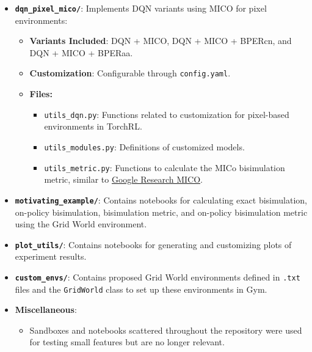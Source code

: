 \begin{itemize}
    \item \textbf{\texttt{dqn\_pixel\_mico/}}: Implements DQN variants using MICO for pixel environments:
    \begin{itemize}
        \item \textbf{Variants Included}: DQN + MICO, DQN + MICO + BPERcn, and DQN + MICO + BPERaa.
        \item \textbf{Customization}: Configurable through \texttt{config.yaml}.
        \item \textbf{Files:}
        \begin{itemize}
            \item \texttt{utils\_dqn.py}: Functions related to customization for pixel-based environments in TorchRL.
            \item \texttt{utils\_modules.py}: Definitions of customized models.
            \item \texttt{utils\_metric.py}: Functions to calculate the MICo bisimulation metric, similar to \href{https://github.com/google-research/google-research/blob/master/mico/atari/metric_utils.py}{Google Research MICO}.
        \end{itemize}
    \end{itemize}

    \item \textbf{\texttt{motivating\_example/}}: Contains notebooks for calculating exact bisimulation, on-policy bisimulation, bisimulation metric, and on-policy bisimulation metric using the Grid World environment.

    \item \textbf{\texttt{plot\_utils/}}: Contains notebooks for generating and customizing plots of experiment results.

    \item \textbf{\texttt{custom\_envs/}}: Contains proposed Grid World environments defined in \texttt{.txt} files and the \texttt{GridWorld} class to set up these environments in Gym.

    \item \textbf{Miscellaneous}:
    \begin{itemize}
        \item Sandboxes and notebooks scattered throughout the repository were used for testing small features but are no longer relevant.
    \end{itemize}
\end{itemize}



